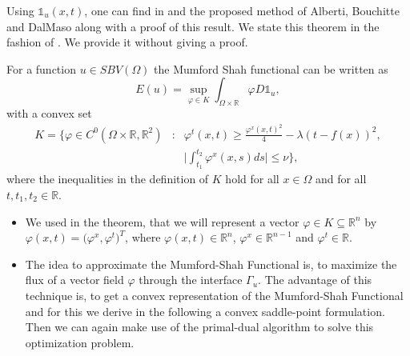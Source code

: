 
    Using $\mathds{1}_{u}(x, t)$, one can find in \cite{Alberti-et-al-lnss} and \cite{Alberti-et-al-cvpde} the proposed method of Alberti, Bouchitte and DalMaso along with a proof of this result. We state this theorem in the fashion of \cite{Pock-et-al-iccv09}. We provide it without giving a proof.

    \begin{theorem}
    \label{convex_relaxation_of_the_mumford_shah_functional}
        For a function $u \in SBV(\Omega)$ the Mumford Shah functional can be written as
            \begin{equation}
                E(u) = \sup_{\varphi \in K} \int_{\Omega \times \mathbb{R}} \varphi D\mathds{1}_{u}, \label{eq:convex_relaxed_ms}
            \end{equation}
        with a convex set
            \begin{eqnarray}
                K = \bigg\{ \varphi \in C^{0}(\Omega \times \mathbb{R}, \mathbb{R}^{2}) &:& \varphi^{t}(x, t) \ge \frac{\varphi^{x}(x,t)^{2}}{4} - \lambda(t - f(x))^{2}, \\
                &&\bigg| \int^{t_{2}}_{t_{1}} \varphi^{x}(x,s)ds \bigg| \le \nu \bigg\}, \label{eq:set_k_continuous}
            \end{eqnarray}
        where the inequalities in the definition of $K$ hold for all $x \in \Omega$ and for all $t, t_{1}, t_{2} \in \mathbb{R}$.
    \end{theorem}

    \begin{remark}
        \begin{itemize}
            \item We used in the theorem, that we will represent a vector $\varphi \in K \subseteq \mathbb{R}^{n}$ by $\varphi(x, t) = \big( \varphi^{x}, \varphi^{t} \big)^{T}$, where $\varphi(x,t) \in \mathbb{R}^{n}$, $\varphi^{x} \in \mathbb{R}^{n-1}$ and $\varphi^{t} \in \mathbb{R}$.
            \item The idea to approximate the Mumford-Shah Functional is, to maximize the flux of a vector field $\varphi$ through the interface $\Gamma_{u}$. The advantage of this technique is, to get a convex representation of the Mumford-Shah Functional and for this we derive in the following a convex saddle-point formulation. Then we can again make use of the primal-dual algorithm to solve this optimization problem.
        \end{itemize}
    \end{remark}

